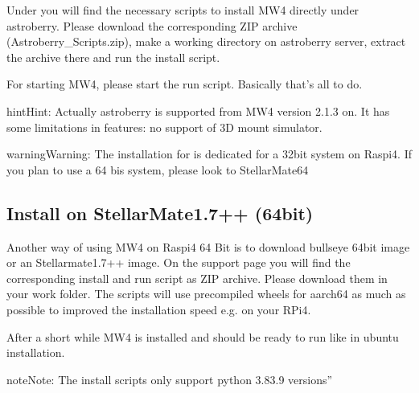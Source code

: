 \documentclass[a4paper,10pt,english]{sphinxmanual}
\begin{document}
\sphinxAtStartPar
Under  you will find
the necessary scripts to install MW4 directly under astroberry. Please download
the corresponding ZIP archive (Astroberry\_Scripts.zip), make a working directory
on astroberry server, extract the archive there and run the install script.

\sphinxAtStartPar
For starting MW4, please start the run script. Basically that’s all to do.

\begin{sphinxadmonition}{hint}{Hint:}
\sphinxAtStartPar
Actually astroberry is supported from MW4 version 2.1.3 on. It has some
limitations in features: no support of 3D mount simulator.
\end{sphinxadmonition}

\begin{sphinxadmonition}{warning}{Warning:}
\sphinxAtStartPar
The installation for is dedicated for a 32bit system on Raspi4. If
you plan to use a 64 bis system, please look to StellarMate64
\end{sphinxadmonition}

\sphinxstepscope


\subsection{Install on StellarMate1.7++ (64bit)}
\label{\detokenize{install/stellarmate64:install-on-stellarmate1-7-64bit}}\label{\detokenize{install/stellarmate64::doc}}
\sphinxAtStartPar
Another way of using MW4 on Raspi4 64 Bit is to download bullseye 64bit image or
an Stellarmate1.7++ image. On the support page you will find the corresponding
install and run script as ZIP archive. Please download them in your work folder.
The scripts will use precompiled wheels for aarch64 as much as possible to improved
the installation speed e.g. on your RPi4.

\begin{sphinxVerbatim}[commandchars=\\\{\}]
\end{sphinxVerbatim}

\sphinxAtStartPar
After a short while MW4 is installed and should be ready to run like in ubuntu
installation.

\begin{sphinxadmonition}{note}{Note:}
\sphinxAtStartPar
The install scripts only support python 3.8\sphinxhyphen{}3.9 versions”
\end{sphinxadmonition}
\end{document}
